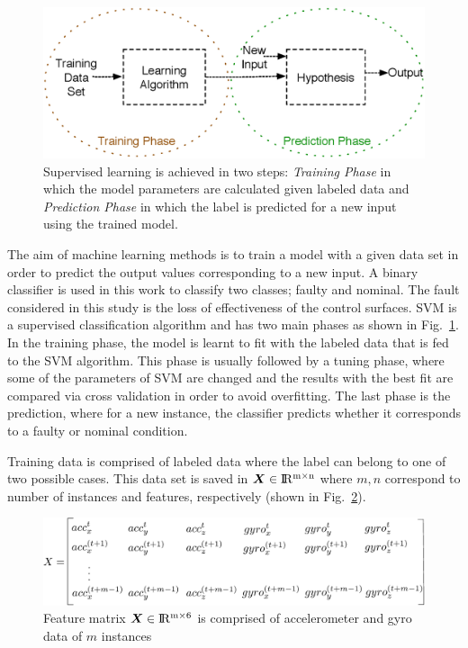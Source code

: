 \begin{figure}
\begin{center}
\includegraphics[width=12cm]{figures/supervisedLearningBasics}    %
\caption{Supervised learning is achieved in two steps: \emph{Training Phase} in which the model parameters are calculated given labeled data and \emph{Prediction Phase} in which the label is predicted for a new input using the trained model.} 
\label{fig:supervisedLearning}
\end{center}
\end{figure}

The aim of machine learning methods is to train a model with a given data set in order to predict the output values corresponding to a new input.
A binary classifier is used in this work to classify two classes; faulty and nominal. 
The fault considered in this study is the loss of effectiveness of the control surfaces. 
SVM is a supervised classification algorithm and has two main phases as shown in Fig.~\ref{fig:supervisedLearning}. 
In the training phase, the model is learnt to fit with the labeled data that is fed to the SVM algorithm. 
This phase is usually followed by a tuning phase, where some of the parameters of SVM are changed and the results with the best fit are compared via cross validation in order to avoid overfitting. 
The last phase is the prediction, where for a new instance, the classifier predicts whether it corresponds to a faulty or nominal condition.

Training data is comprised of labeled data where the label can belong to one of two possible cases. 
This data set is saved in $\bm{X} \in {\rm I\!R^{m \times n}}  $ where $m,n$ correspond to number of instances and features, respectively (shown in Fig.~\ref{fig:featureMatrix}). 

\begin{figure}[h]
\begin{center}
\includegraphics[width=13cm]{figures/featureMatrix}    %
\caption{Feature matrix $\bm{X} \in {\rm I\!R^{m \times 6}}  $  is comprised of accelerometer and gyro data of $m$ instances} 
\label{fig:featureMatrix}
\end{center}
\end{figure}

